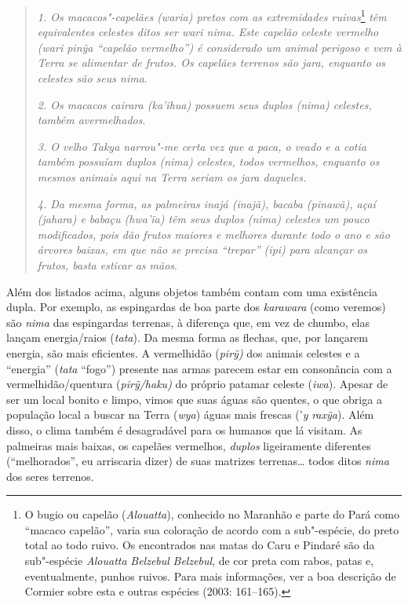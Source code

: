 \begin{quote}
\emph{1. Os macacos"-capelães (\emph{waria}) pretos com as
extremidades ruivas}\footnote{O bugio ou capelão (\emph{Alouatta}),
  conhecido no Maranhão e parte do Pará como ``macaco capelão'', varia sua
  coloração de acordo com a sub"-espécie, do preto total ao todo ruivo.
  Os encontrados nas matas do Caru e Pindaré são da sub"-espécie
  \emph{Alouatta} \emph{Belzebul} \emph{Belzebul}, de cor preta com
  rabos, patas e, eventualmente, punhos ruivos. Para mais informações,
  ver a boa descrição de Cormier sobre esta e outras espécies (2003:
  161--165).} \emph{têm equivalentes celestes ditos ser \emph{wari nima}. Este
  capelão celeste vermelho (\emph{wari} \emph{pinỹa} ``capelão vermelho'')
  é considerado um animal perigoso e vem à Terra se alimentar de frutos.
  Os capelães terrenos são \emph{jara}, enquanto os celestes são seus
  \emph{nima}}.

\noindent
\emph{2. Os macacos cairara (\emph{ka'ihua}) possuem seus duplos
(\emph{nima}) celestes, também avermelhados}.

\noindent
\emph{3. O velho Takya narrou"-me certa vez que a paca, o veado e a
cotia também possuíam duplos (\emph{nima}) celestes, todos vermelhos,
enquanto os mesmos animais aqui na Terra seriam os \emph{jara} daqueles.}

\noindent
\emph{4. Da mesma forma, as palmeiras inajá (\emph{inajã}), bacaba
(\emph{pinawã}), açaí (\emph{jahara}) e babaçu (\emph{hwa'ĩa}) têm seus
duplos (\emph{nima}) celestes um pouco modificados, pois dão frutos
maiores e melhores durante todo o ano e são árvores baixas, em que não
se precisa ``trepar'' (\emph{ipi}) para alcançar os frutos, basta esticar
as mãos}.
\end{quote}

Além dos listados acima, alguns objetos também contam com uma existência
dupla. Por exemplo, as espingardas de boa parte dos \emph{karawara}
(como veremos) são \emph{nima} das espingardas terrenas, à diferença
que, em vez de chumbo, elas lançam energia/raios (\emph{tata}). Da mesma
forma as flechas, que, por lançarem energia, são mais eficientes. A
vermelhidão (\emph{pirỹ)} dos animais celestes e a ``energia''
(\emph{tata} ``fogo'') presente nas armas parecem estar em consonância com
a vermelhidão/quentura (\emph{pirỹ/haku)} do próprio patamar celeste
(\emph{iwa}). Apesar de ser um local bonito e limpo, vimos que suas
águas são quentes, o que obriga a população local a buscar na Terra
(\emph{wya}) águas mais frescas ('\emph{y} \emph{raxỹa}). Além disso, o
clima também é desagradável para os humanos que lá visitam. As palmeiras
mais baixas, os capelães vermelhos, \emph{duplos} ligeiramente
diferentes (``melhorados'', eu arriscaria dizer) de suas matrizes
terrenas\ldots{} todos ditos \emph{nima} dos seres terrenos.

